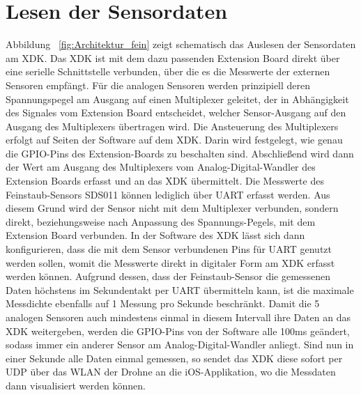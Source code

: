 \section{Lesen der Sensordaten}\label{sec:Lesen der Sensordaten}
Abbildung ~\ref{fig:Architektur_fein} zeigt schematisch das Auslesen der Sensordaten am \acs{XDK}. Das \acs{XDK} ist mit dem dazu passenden Extension Board direkt über eine serielle Schnittstelle verbunden, über die es die Messwerte der externen Sensoren empfängt. 
\newline
Für die analogen Sensoren werden prinzipiell deren Spannungspegel am Ausgang auf einen Multiplexer geleitet, der in Abhängigkeit des Signales vom Extension Board entscheidet, welcher Sensor-Ausgang auf den Ausgang des Multiplexers übertragen wird. Die Ansteuerung des Multiplexers erfolgt auf Seiten der Software auf dem \acs{XDK}. Darin wird festgelegt, wie genau die \acs{GPIO}-Pins des Extension-Boards zu beschalten sind. Abschließend wird dann der Wert am Ausgang des Multiplexers vom Analog-Digital-Wandler des Extension Boards erfasst und an das \acs{XDK} übermittelt.
\newline
Die Messwerte des Feinstaub-Sensors SDS011 können lediglich über \acs{UART} erfasst werden. Aus diesem Grund wird der Sensor nicht mit dem Multiplexer verbunden, sondern direkt, beziehungsweise nach Anpassung des Spannungs-Pegels, mit dem Extension Board verbunden. In der Software des \acs{XDK} lässt sich dann konfigurieren, dass die mit dem Sensor verbundenen Pins für \acs{UART} genutzt werden sollen, womit die Messwerte direkt in digitaler Form am XDK erfasst werden können.
\newline
Aufgrund dessen, dass der Feinstaub-Sensor die gemessenen Daten höchstens im Sekundentakt per UART übermitteln kann, ist die maximale Messdichte ebenfalls auf 1 Messung pro Sekunde beschränkt. Damit die 5 analogen Sensoren auch mindestens einmal in diesem Intervall ihre Daten an das XDK weitergeben, werden die \acs{GPIO}-Pins von der Software alle 100ms geändert, sodass immer ein anderer Sensor am Analog-Digital-Wandler anliegt. 
\newline
Sind nun in einer Sekunde alle Daten einmal gemessen, so sendet das \acs{XDK} diese sofort per \acs{UDP} über das \acs{WLAN} der Drohne an die iOS-Applikation, wo die Messdaten dann visualisiert werden können.

